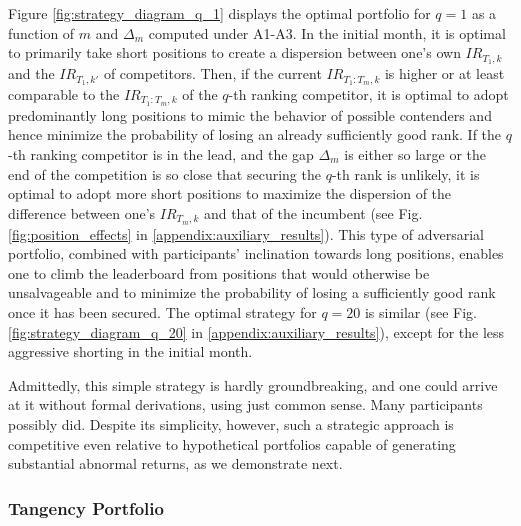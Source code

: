 \documentclass[3p,times,twocolumn]{elsarticle}
\begin{document}
Figure \ref{fig:strategy_diagram_q_1} displays the optimal portfolio for $q=1$ as a function of $m$ and $\Delta_{m}$ computed under A1-A3.
In the initial month, it is optimal to primarily take short positions to create a dispersion between one's own $IR_{T_{1},k}$ and the $IR_{T_{1},k'}$ of competitors.
Then, if the current $IR_{T_{1}:T_{m},k}$ is higher or at least comparable to the $IR_{T_{1}:T_{m},k}$ of the $q$-th ranking competitor, it is optimal to adopt predominantly long positions to mimic the behavior of possible contenders and hence minimize the probability of losing an already sufficiently good rank.
If the $q$-th ranking competitor is in the lead, and the gap $\Delta_{m}$ is either so large or the end of the competition is so close that securing the $q$-th rank is unlikely, it is optimal to adopt more short positions to maximize the dispersion of the difference between one's $IR_{T_{m},k}$ and that of the incumbent (see Fig. \ref{fig:position_effects} in \ref{appendix:auxiliary_results}).
This type of adversarial portfolio, combined with participants' inclination towards long positions, enables one to climb the leaderboard from positions that would otherwise be unsalvageable and to minimize the probability of losing a sufficiently good rank once it has been secured.
The optimal strategy for $q=20$ is similar (see Fig. \ref{fig:strategy_diagram_q_20} in \ref{appendix:auxiliary_results}), except for the less aggressive shorting in the initial month.

Admittedly, this simple strategy is hardly groundbreaking, and one could arrive at it without formal derivations, using just common sense.
Many participants possibly did.
Despite its simplicity, however, such a strategic approach is competitive even relative to hypothetical portfolios capable of generating substantial abnormal returns, as we demonstrate next.

\subsubsection{Tangency Portfolio}\label{subsection:tangency_portfolio}
\end{document}

